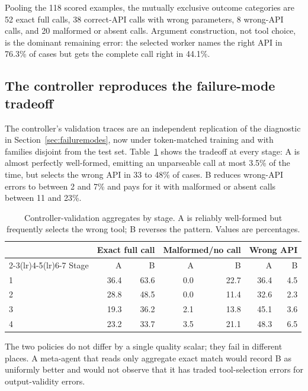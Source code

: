 \documentclass{article}
\begin{document}
Pooling the 118 scored examples, the mutually exclusive outcome categories are 52 exact full calls, 38 correct-API calls with wrong parameters, 8 wrong-API calls, and 20 malformed or absent calls. Argument construction, not tool choice, is the dominant remaining error: the selected worker names the right API in 76.3\% of cases but gets the complete call right in 44.1\%.

\subsection{The controller reproduces the failure-mode tradeoff}

The controller's validation traces are an independent replication of the diagnostic in Section~\ref{sec:failuremodes}, now under token-matched training and with families disjoint from the test set. Table~\ref{tab:valtradeoff} shows the tradeoff at every stage: A is almost perfectly well-formed, emitting an unparseable call at most 3.5\% of the time, but selects the wrong API in 33 to 48\% of cases. B reduces wrong-API errors to between 2 and 7\% and pays for it with malformed or absent calls between 11 and 23\%.

\begin{table}[t]
\centering
\caption{Controller-validation aggregates by stage. A is reliably well-formed but frequently selects the wrong tool; B reverses the pattern. Values are percentages.}
\label{tab:valtradeoff}
\begin{tabular}{lrrrrrr}
\toprule
& \multicolumn{2}{c}{Exact full call} & \multicolumn{2}{c}{Malformed/no call} & \multicolumn{2}{c}{Wrong API} \\
\cmidrule(lr){2-3}\cmidrule(lr){4-5}\cmidrule(lr){6-7}
Stage & A & B & A & B & A & B \\
\midrule
1 & 36.4 & 63.6 & 0.0 & 22.7 & 36.4 & 4.5 \\
2 & 28.8 & 48.5 & 0.0 & 11.4 & 32.6 & 2.3 \\
3 & 19.3 & 36.2 & 2.1 & 13.8 & 45.1 & 3.6 \\
4 & 23.2 & 33.7 & 3.5 & 21.1 & 48.3 & 6.5 \\
\bottomrule
\end{tabular}
\end{table}

The two policies do not differ by a single quality scalar; they fail in different places. A meta-agent that reads only aggregate exact match would record B as uniformly better and would not observe that it has traded tool-selection errors for output-validity errors.
\end{document}
